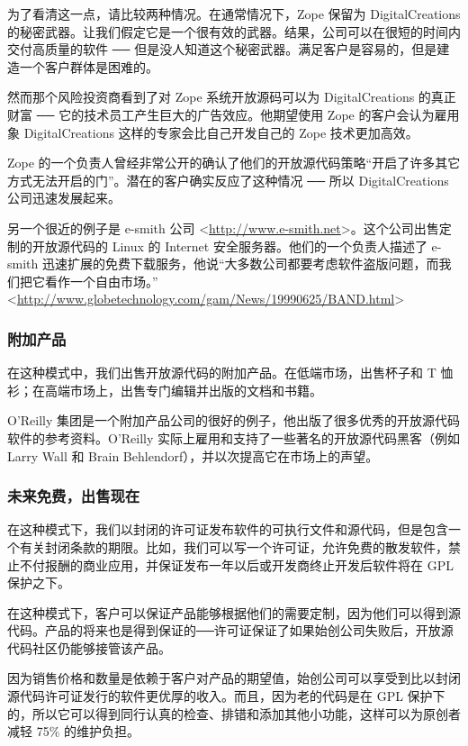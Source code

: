 为了看清这一点，请比较两种情况。在通常情况下，Zope 保留为 DigitalCreations 的秘密武器。让我们假定它是一个很有效的武器。结果，公司可以在很短的时间内交付高质量的软件 ── 但是没人知道这个秘密武器。满足客户是容易的，但是建造一个客户群体是困难的。


然而那个风险投资商看到了对 Zope 系统开放源码可以为 DigitalCreations 的真正财富 ── 它的技术员工产生巨大的广告效应。他期望使用 Zope 的客户会认为雇用象 DigitalCreations 这样的专家会比自己开发自己的 Zope 技术更加高效。


Zope 的一个负责人曾经非常公开的确认了他们的开放源代码策略“开启了许多其它方式无法开启的门”。潜在的客户确实反应了这种情况 ── 所以 DigitalCreations 公司迅速发展起来。


另一个很近的例子是 e-smith 公司 <\url{http://www.e-smith.net}>。这个公司出售定制的开放源代码的 Linux 的 Internet 安全服务器。他们的一个负责人描述了 e-smith 迅速扩展的免费下载服务，他说“大多数公司都要考虑软件盗版问题，而我们把它看作一个自由市场。” <\url{http://www.globetechnology.com/gam/News/19990625/BAND.html}>

\subsubsection{附加产品}
在这种模式中，我们出售开放源代码的附加产品。在低端市场，出售杯子和 T 恤衫；在高端市场上，出售专门编辑并出版的文档和书籍。


O'Reilly 集团是一个附加产品公司的很好的例子，他出版了很多优秀的开放源代码软件的参考资料。O'Reilly 实际上雇用和支持了一些著名的开放源代码黑客（例如 Larry Wall 和 Brain Behlendorf），并以次提高它在市场上的声望。

\subsubsection{未来免费，出售现在}
在这种模式下，我们以封闭的许可证发布软件的可执行文件和源代码，但是包含一个有关封闭条款的期限。比如，我们可以写一个许可证，允许免费的散发软件，禁止不付报酬的商业应用，并保证发布一年以后或开发商终止开发后软件将在 GPL 保护之下。


在这种模式下，客户可以保证产品能够根据他们的需要定制，因为他们可以得到源代码。产品的将来也是得到保证的──许可证保证了如果始创公司失败后，开放源代码社区仍能够接管该产品。


因为销售价格和数量是依赖于客户对产品的期望值，始创公司可以享受到比以封闭源代码许可证发行的软件更优厚的收入。而且，因为老的代码是在 GPL 保护下的，所以它可以得到同行认真的检查、排错和添加其他小功能，这样可以为原创者减轻 75\% 的维护负担。


